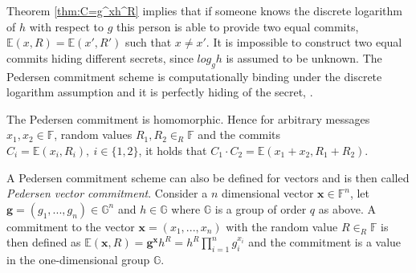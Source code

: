 Theorem \ref{thm:C=g^xh^R} implies that if someone knows the discrete logarithm of $h$ with respect to $g$ this person is able to provide two equal commits, $\mathds{E}(x,R)=\mathds{E}(x',R')$ such that $x\neq x'$. It is impossible to construct two equal commits hiding different secrets, since $log_g h$ is assumed to be unknown. The Pedersen commitment scheme is computationally binding under the discrete logarithm assumption and it is perfectly hiding of the secret, \cite{pedersen}. 

The Pedersen commitment is homomorphic. Hence for arbitrary messages $x_1,x_2\in\mathds{F}$, random values $R_1,R_2\in_R\mathds{F}$ and the commits $C_i=\mathds{E}(x_i,R_i),\:i\in\{1,2\}$, it holds that $C_1\cdot C_2 = \mathds{E}(x_1+x_2,R_1+R_2)$.


A Pedersen commitment scheme can also be defined for vectors and is then called \textit{Pedersen vector commitment}. Consider a $n$ dimensional vector $\mathbf{x}\in\mathds{F}^n$, let $\mathbf{g}=(g_1,...,g_n) \in\mathds{G}^n$ and $h\in\mathds{G}$ where $\mathds{G}$ is a group of order $q$ as above. A commitment to the vector  $\mathbf{x}=(x_1,...,x_n)$  with the random value $R\in_R \mathds{F}$ is then defined as $\mathds{E}(\mathbf{x},R) = \mathbf{g}^\mathbf{x}h^R = h^R\prod_{i=1}^n g_i^{x_i}$ and the commitment is a value in the one-dimensional group $\mathds{G}$. 

